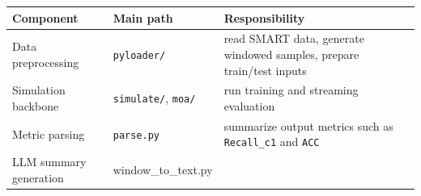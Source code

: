 \documentclass[
  11pt,
  a4paper]{article}
\begin{document}
\begin{longtable}[]{@{}lll@{}}
\toprule
\begin{minipage}[b]{0.30\columnwidth}\raggedright
Component\strut
\end{minipage} & \begin{minipage}[b]{0.30\columnwidth}\raggedright
Main path\strut
\end{minipage} & \begin{minipage}[b]{0.30\columnwidth}\raggedright
Responsibility\strut
\end{minipage}\tabularnewline
\midrule
\endhead
\begin{minipage}[t]{0.30\columnwidth}\raggedright
Data preprocessing\strut
\end{minipage} & \begin{minipage}[t]{0.30\columnwidth}\raggedright
\texttt{pyloader/}\strut
\end{minipage} & \begin{minipage}[t]{0.30\columnwidth}\raggedright
read SMART data, generate windowed samples, prepare train/test
inputs\strut
\end{minipage}\tabularnewline
\begin{minipage}[t]{0.30\columnwidth}\raggedright
Simulation backbone\strut
\end{minipage} & \begin{minipage}[t]{0.30\columnwidth}\raggedright
\texttt{simulate/}, \texttt{moa/}\strut
\end{minipage} & \begin{minipage}[t]{0.30\columnwidth}\raggedright
run training and streaming evaluation\strut
\end{minipage}\tabularnewline
\begin{minipage}[t]{0.30\columnwidth}\raggedright
Metric parsing\strut
\end{minipage} & \begin{minipage}[t]{0.30\columnwidth}\raggedright
\texttt{parse.py}\strut
\end{minipage} & \begin{minipage}[t]{0.30\columnwidth}\raggedright
summarize output metrics such as \texttt{Recall\_c1} and
\texttt{ACC}\strut
\end{minipage}\tabularnewline
\begin{minipage}[t]{0.30\columnwidth}\raggedright
LLM summary generation\strut
\end{minipage} & \begin{minipage}[t]{0.30\columnwidth}\raggedright
window\_to\_text.py\strut

\end{minipage}
\end{longtable}
\end{document}
